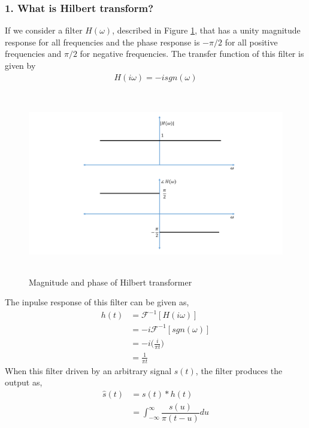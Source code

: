 \subsubsection{1. What is Hilbert transform?}
If we consider a filter $H(\omega)$, described in Figure \ref{Hilbert_Transformer}, that has a unity magnitude response for all frequencies and the phase response is $-\pi/2$ for all positive frequencies and $\pi/2$ for negative frequencies. The transfer function of this filter is given by
\begin{equation}
\begin{split}
H(i\omega)=-isgn(\omega)
\end{split}
\label{}
\end{equation}
\begin{figure}[h]
	\centering
	\includegraphics[width=1.0\textwidth, height=8cm]{./sdf/simplified_coherent_receiver/figures/HT.pdf}
	\caption{Magnitude and phase of Hilbert transformer}\label{Hilbert_Transformer}
\end{figure}
The inpulse response of this filter can be given as,
\begin{equation}
\begin{split}
h(t)&=\mathcal{F}^{-1}[H(i\omega)]\\
&=-i\mathcal{F}^{-1}[sgn(\omega)]\\
&=-i\bigg(\frac{i}{\pi t}\bigg)\\
&=\frac{1}{\pi t}
\end{split}
\label{}
\end{equation}
When this filter driven by an arbitrary signal $s(t)$, the filter produces the output as,
\begin{equation}
\begin{split}
\hat{s}(t)&=s(t) * h(t)\\
&=\int_{-\infty}^{\infty} \dfrac{s(u)}{\pi(t-u)}du\\
\end{split}
\label{}
\end{equation}

